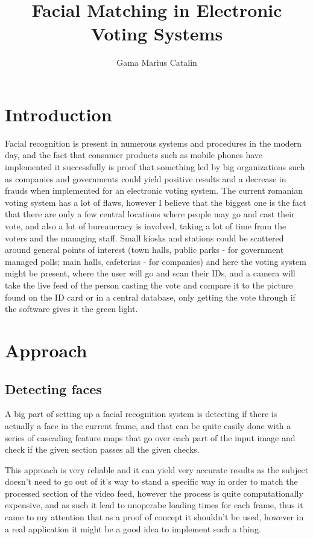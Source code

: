 \documentclass[12pt]{article} %
\title{Facial Matching in Electronic Voting Systems}
\author{Gama Marius Catalin}
\date{} %
\begin{document}
\maketitle

\section{Introduction}
	Facial recognition is present in numerous systems and procedures in the modern day, and the fact that consumer products such as mobile phones have implemented it successfully is proof that something led by big organizations such as companies and governments could yield positive results and a decrease in frauds when implemented for an electronic voting system.\cite{a2}
	The current romanian voting system has a lot of flaws, however I believe that the biggest one is the fact that there are only a few central locations where people may go and cast their vote, and also a lot of bureaucracy is involved, taking a lot of time from the voters and the managing staff.
	Small kiosks and stations could be scattered around general points of interest (town halls, public parks - for government managed polls; main halls, cafeterias - for companies) and here the voting system might be present, where the user will go and scan their IDs, and a camera will take the live feed of the person casting the vote and compare it to the picture found on the ID card or in a central database, only getting the vote through if the software gives it the green light.


\section{Approach}

\subsection{Detecting faces}

	A big part of setting up a facial recognition system is detecting if there is actually a face in the current frame, and that can be quite easily done with a series of cascading feature maps \cite{a3}\cite{v2} that go over each part of the input image and check if the given section passes all the given checks. 



	This approach is very reliable and it can yield very accurate results as the subject doesn't need to go out of it's way to stand a specific way in order to match the processed section of the video feed, however the process is quite computationally expensive, and as such it lead to unoperabe loading times for each frame, thus it came to my attention that as a proof of concept it shouldn't be used, however in a real application it might be a good idea to implement such a thing.
\end{document}
